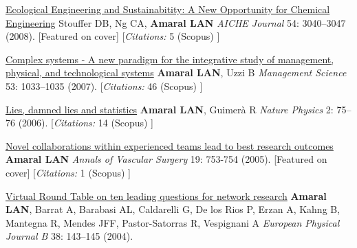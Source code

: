 \NumberedItem{\makebox[0.8cm][r]{[6]}}
\href{/people/amaral/ecological-engineering-and-sustainabitity-a-new-opportunity-for-chemical-engineering}
{Ecological Engineering and Sustainabitity: A New Opportunity for Chemical Engineering}
\newline
Stouffer DB, Ng CA, {\textbf{Amaral LAN}}
\newline
\textit{AICHE Journal}
    54:
3040--3047 (2008).
    [Featured on cover]
    [{\em{Citations:}}  5 (Scopus) ]
\newline
\Gap
~
\Gap

\NumberedItem{\makebox[0.8cm][r]{[5]}}
\href{/people/amaral/complex-systems-a-new-paradigm-for-the-integrative-study-of-management-physical-and-technological-systems}
{Complex systems - A new paradigm for the integrative study of management, physical, and technological systems}
\newline
{\textbf{Amaral LAN}}, Uzzi B
\newline
\textit{Management Science}
    53:
1033--1035 (2007).
    [{\em{Citations:}}  46 (Scopus) ]
\newline
\Gap
~
\Gap

\NumberedItem{\makebox[0.8cm][r]{[4]}}
\href{/people/amaral/lies-damned-lies-and-statistics}
{Lies, damned lies and statistics}
\newline
{\textbf{Amaral LAN}}, Guimer\`a R
\newline
\textit{Nature Physics}
    2:
75--76 (2006).
    [{\em{Citations:}}  14 (Scopus) ]
\newline
\Gap
~
\Gap

\NumberedItem{\makebox[0.8cm][r]{[3]}}
\href{/people/amaral/novel-collaborations-within-experienced-teams-lead-to-best-research-outcomes}
{Novel collaborations within experienced teams lead to best research outcomes}
\newline
{\textbf{Amaral LAN}}
\newline
\textit{Annals of Vascular Surgery}
    19:
753-754 (2005).
    [Featured on cover]
    [{\em{Citations:}}  1 (Scopus) ]
\newline
\Gap
~
\Gap

\NumberedItem{\makebox[0.8cm][r]{[2]}}
\href{False}
{Virtual Round Table on ten leading questions for network research}
\newline
{\textbf{Amaral LAN}}, Barrat A, Barabasi AL, Caldarelli G, De los Rios P, Erzan A, Kahng B, Mantegna R, Mendes JFF, Pastor-Satorras R, Vespignani A 
\newline
\textit{European Physical Journal B}
    38:
143--145  (2004).
\newline
\Gap
~
\Gap

